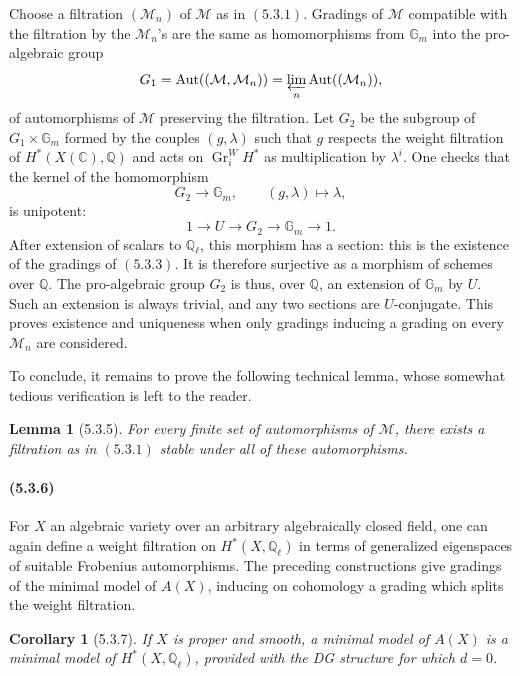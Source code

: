 \documentclass[11pt]{article}
\newtheorem{lemma}{Lemma}
\newtheorem{corollary}{Corollary}
\theoremstyle{remark}
\newcommand{\Ql}{\mathbb{Q}_\ell}
\newcommand{\QQ}{\mathbb{Q}}
\newcommand{\CC}{\mathbb{C}}
\begin{document}
Choose a filtration \((\mathcal M_n)\) of \(\mathcal M\) as in \((5.3.1)\).  Gradings of \(\mathcal M\) compatible with the filtration by the \(\mathcal M_n\)'s are the same as homomorphisms from \(\mathbb G_m\) into the pro-algebraic group
\[
G_1=\operatorname{Aut}((\mathcal M,\mathcal M_n))
=\varprojlim_n\operatorname{Aut}((\mathcal M_n)),
\]
of automorphisms of \(\mathcal M\) preserving the filtration.  Let \(G_2\) be the subgroup of \(G_1\times\mathbb G_m\) formed by the couples \((g,\lambda)\) such that \(g\) respects the weight filtration of \(H^*(X(\CC),\QQ)\) and acts on \(\operatorname{Gr}^W_iH^*\) as multiplication by \(\lambda^i\).  One checks that the kernel of the homomorphism
\[
G_2\longrightarrow \mathbb G_m,\qquad (g,\lambda)\mapsto \lambda,
\]
is unipotent:
\[
1\longrightarrow U\longrightarrow G_2\longrightarrow \mathbb G_m\longrightarrow 1.
\]
After extension of scalars to \(\Ql\), this morphism has a section: this is the existence of the gradings of \((5.3.3)\).  It is therefore surjective as a morphism of schemes over \(\QQ\).  The pro-algebraic group \(G_2\) is thus, over \(\QQ\), an extension of \(\mathbb G_m\) by \(U\).  Such an extension is always trivial, and any two sections are \(U\)-conjugate.  This proves existence and uniqueness when only gradings inducing a grading on every \(\mathcal M_n\) are considered.

To conclude, it remains to prove the following technical lemma, whose somewhat tedious verification is left to the reader.

\begin{lemma}[5.3.5]
For every finite set of automorphisms of \(\mathcal M\), there exists a filtration as in \((5.3.1)\) stable under all of these automorphisms.
\end{lemma}

\paragraph{(5.3.6)}
For \(X\) an algebraic variety over an arbitrary algebraically closed field, one can again define a weight filtration on \(H^*(X,\Ql)\) in terms of generalized eigenspaces of suitable Frobenius automorphisms.  The preceding constructions give gradings of the minimal model of \(A(X)\), inducing on cohomology a grading which splits the weight filtration.

\begin{corollary}[5.3.7]
If \(X\) is proper and smooth, a minimal model of \(A(X)\) is a minimal model of \(H^*(X,\Ql)\), provided with the DG structure for which \(d=0\).
\end{corollary}
\end{document}
